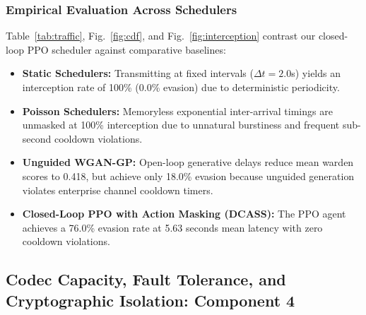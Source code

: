 \documentclass[11pt,journal,onecolumn]{IEEEtran}\linespread{1.3}
\begin{document}
\subsubsection{Empirical Evaluation Across Schedulers}
Table~\ref{tab:traffic}, Fig.~\ref{fig:cdf}, and Fig.~\ref{fig:interception} contrast our closed-loop PPO scheduler against comparative baselines:
\begin{itemize}
    \item \textbf{Static Schedulers:} Transmitting at fixed intervals ($\Delta t = 2.0$s) yields an interception rate of 100\% (0.0\% evasion) due to deterministic periodicity.
    \item \textbf{Poisson Schedulers:} Memoryless exponential inter-arrival timings are unmasked at 100\% interception due to unnatural burstiness and frequent sub-second cooldown violations.
    \item \textbf{Unguided WGAN-GP:} Open-loop generative delays reduce mean warden scores to 0.418, but achieve only 18.0\% evasion because unguided generation violates enterprise channel cooldown timers.
    \item \textbf{Closed-Loop PPO with Action Masking (DCASS):} The PPO agent achieves a 76.0\% evasion rate at 5.63 seconds mean latency with zero cooldown violations.
\end{itemize}

\begin{table}[t]
\caption{Network Traffic Evasion Against Calibrated Warden Sequence Detector ($N = 100$ Evaluation Sessions)}
\label{tab:traffic}
\centering
{}
\end{table}

\subsection{Codec Capacity, Fault Tolerance, and Cryptographic Isolation: Component 4}
\end{document}
